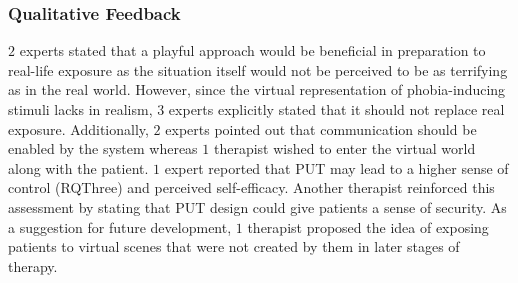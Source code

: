 \subsubsection*{Qualitative Feedback}
$2$ experts stated that a playful approach would be beneficial in preparation to real-life exposure as the situation itself would not be perceived to be as terrifying as in the real world. However, since the virtual representation of phobia-inducing stimuli lacks in realism, $3$ experts explicitly stated that it should not replace real exposure. Additionally, $2$ experts pointed out that communication should be enabled by the system whereas $1$ therapist wished to enter the virtual world along with the patient. $1$ expert reported that \ac{PUT} may lead to a higher sense of control (\acl{RQThree}) and perceived self-efficacy. Another therapist reinforced this assessment by stating that \ac{PUT} design could give patients a sense of security. As a suggestion for future development, $1$ therapist proposed the idea of exposing patients to virtual scenes that were not created by them in later stages of therapy.







